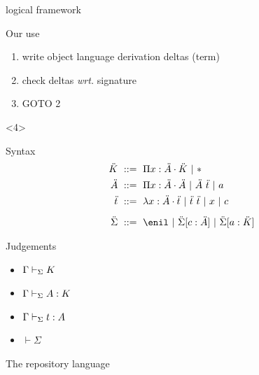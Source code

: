 \documentclass[ignorenonframetext,red]{beamer}
\begin{document}
\begin{frame}{ logical framework }
\begin{onlyenv}
\begin{block}{Our use}
\begin{enumerate}
      \item write object language derivation deltas (term)
      \item check deltas \emph{wrt.} signature
      \item GOTO 2
      \end{enumerate}
    \end{block}
  \end{onlyenv}
  \begin{onlyenv}<4>
    \begin{block}{Syntax}
      \inXLF
      \begin{align*}
        \mk &\gequal { \prd\mv\mf\mk \gor \type } \\
        \mf &\gequal { \prd\mv\mf\mf \gor \app\mf\mo \gor \mcf } \\
        \mo &\gequal { \lam\mv\mf\mo \gor \app\mo\mo \gor \mv \gor \mco } \\[0.5em]
        \msi &\gequal { \enil \gor \ebinddecl\msi\mco\mf \gor
          \ebinddecl\msi\mcf\mk }
      \end{align*}
    \end{block}
    \begin{block}{Judgements}
      \begin{itemize}
      \item ${\Gamma}\vdash_{\Sigma}{K}$
      \item ${\Gamma}\vdash_{\Sigma}{{A}:{K}}$
      \item ${\Gamma}\vdash_{\Sigma}{{t}:{A}}$
      \item $\vdash \Sigma$
      \end{itemize}
    \end{block}
  \end{onlyenv}
\end{frame}

\begin{frame}{The repository language}
  
\end{frame}


\end{document}
